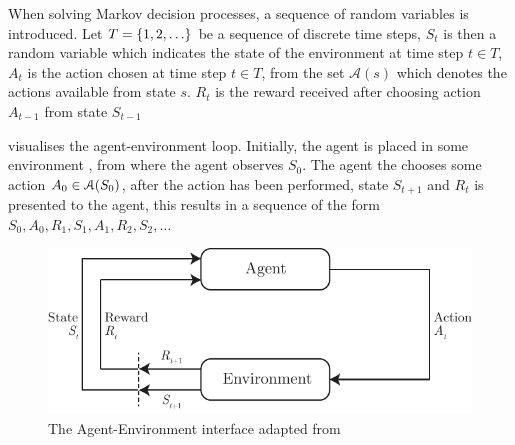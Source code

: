 \vspace*{1em}

When solving Markov decision processes, a sequence of random variables is introduced. Let $T = \left\{1, 2, \ldots\right\}$ be a sequence of discrete time steps, $S_t$ is then a random variable which indicates the state of the environment at time step $t \in T$, $A_t$ is the action chosen at time step $t \in T$, from the set $\mathcal{A}(s)$ which denotes the actions available from state $s$. 
$R_t$ is the reward received after choosing action $A_{t-1}$ from state $S_{t-1}$


\vspace*{1em}

 visualises the agent-environment loop. 
Initially, the agent is placed in some environment , from where the agent observes $S_0$.
The agent the chooses some action $A_0 \in \mathcal{A}(S_0)$, after the action has been performed, state $S_{t+1}$ and $R_t$ is presented to the agent, this results in a sequence of the form $S_0,A_0,R_1,S_1,A_1,R_2,S_2,\ldots$

\begin{figure}[!htb]
    \centering
    \includegraphics[scale=1]{../include/agent-environment-loop.pdf}
    \caption{The Agent-Environment interface adapted from \citet[chap. 3]{RLBook2018}}
    \label{fig:agent-environment}
\end{figure}

